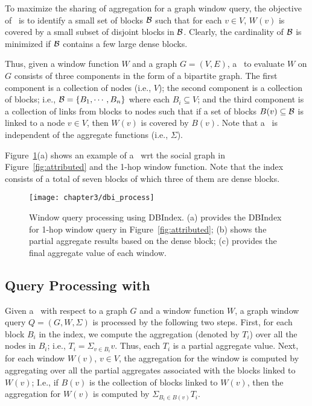 To maximize the sharing of aggregation for a graph window query, 
the objective of \DBIndex\ is to identify a small set of blocks ${\cal B}$ such that
for each $v \in V$, $W(v)$ is covered by a small subset of disjoint blocks in ${\cal B}$.
Clearly, the cardinality of ${\cal B}$ is minimized if ${\cal B}$ contains a few large dense blocks.

Thus, given a window function $W$ and a graph $G=(V,E)$,
a \DBIndex\ to evaluate $W$ on $G$ consists of three components in the form of a bipartite graph.
The first component is a collection of nodes (i.e., $V$);
the second component is a collection of blocks; i.e., ${\cal B} = \{B_1,\cdots,B_n\}$ where each $B_i \subseteq V$;
and the third component is a collection of links from blocks to nodes
such that if a set of blocks $B(v) \subseteq {\cal B}$ is linked to a node $v \in V$,
then $W(v)$ is covered by $B(v)$.
Note that a \DBIndex\ is independent of the aggregate functions (i.e., $\Sigma$).

Figure~\ref{fig:dbi_agg}(a) shows an example of a \DBIndex\ wrt the social graph in Figure~\ref{fig:attributed} and the 1-hop window function.
Note that the index consists of a total of seven blocks of which three of them are dense blocks.

\begin{figure}[t]
\centerline{
	\texttt{[image: chapter3/dbi\_process]} 
	}
	\caption{Window query processing using DBIndex. (a) provides the DBIndex for 1-hop window query in Figure~\ref{fig:attributed}; (b) shows the partial aggregate results based on the dense block; (c) provides the final aggregate value of each window.}
	\label{fig:dbi_agg}
\end{figure}

\subsection{Query Processing with \DBIndex}
Given a \DBIndex\ with respect to a graph $G$ and a window function $W$, a graph window query $Q = (G, W, \Sigma)$ is processed by the following two steps.
First, for each block $B_i$ in the index, we compute the aggregation (denoted by $T_i$) over all the nodes in $B_i$;
i.e., $T_i = \Sigma_{v \in B_i} v$. 
Thus, each $T_i$ is a partial aggregate value.
Next, for each window $W(v)$, $v \in V$, the aggregation for the window is computed by aggregating over all the partial aggregates associated with the blocks linked to $W(v)$;
I.e., if $B(v)$ is the collection of blocks linked to $W(v)$, 
then the aggregation for $W(v)$ is computed by $\Sigma_{B_i \in B(v)} T_i$. 

